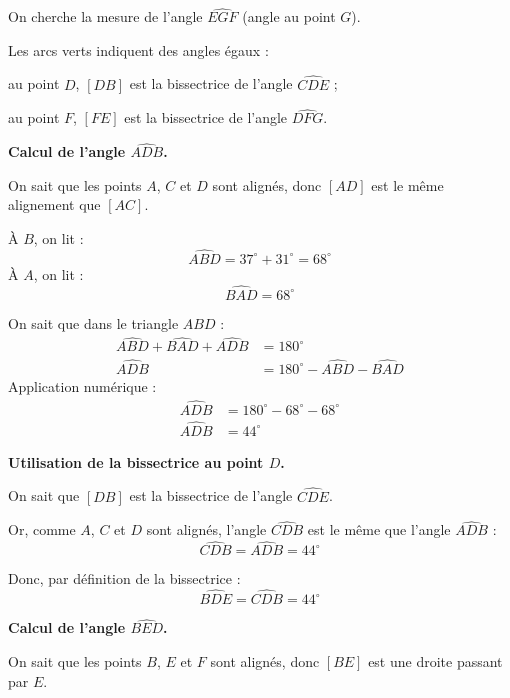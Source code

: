 \documentclass[answers]{exam}
\begin{document}
\begin{solution}
On cherche la mesure de l'angle $\widehat{EGF}$ (angle au point $G$).

\begin{Indication}
Les arcs verts indiquent des angles égaux : \\
\begin{compactitem}
\item au point $D$, $[DB]$ est la bissectrice de l'angle $\widehat{CDE}$ ;
\item au point $F$, $[FE]$ est la bissectrice de l'angle $\widehat{DFG}$.
\end{compactitem}
\end{Indication}

\begin{compactenum}
\item \textbf{Calcul de l'angle $\widehat{ADB}$.}

On sait que les points $A$, $C$ et $D$ sont alignés, donc $[AD]$ est le même alignement que $[AC]$.

À $B$, on lit :
\[
\widehat{ABD} = 37^\circ + 31^\circ = 68^\circ
\]
À $A$, on lit :
\[
\widehat{BAD} = 68^\circ
\]

On sait que dans le triangle $ABD$ :
\begin{align*}
\widehat{ABD} + \widehat{BAD} + \widehat{ADB} &= 180^\circ \\
\widehat{ADB} &= 180^\circ - \widehat{ABD} - \widehat{BAD}
\end{align*}
Application numérique :
\begin{align*}
\widehat{ADB} &= 180^\circ - 68^\circ - 68^\circ \\
\widehat{ADB} &= 44^\circ
\end{align*}

\item \textbf{Utilisation de la bissectrice au point $D$.}

On sait que $[DB]$ est la bissectrice de l'angle $\widehat{CDE}$.

Or, comme $A$, $C$ et $D$ sont alignés, l'angle $\widehat{CDB}$ est le même que l'angle $\widehat{ADB}$ :
\[
\widehat{CDB} = \widehat{ADB} = 44^\circ
\]

Donc, par définition de la bissectrice :
\[
\widehat{BDE} = \widehat{CDB} = 44^\circ
\]

\item \textbf{Calcul de l'angle $\widehat{BED}$.}

On sait que les points $B$, $E$ et $F$ sont alignés, donc $[BE]$ est une droite passant par $E$.


\end{compactenum}
\end{solution}
\end{document}
